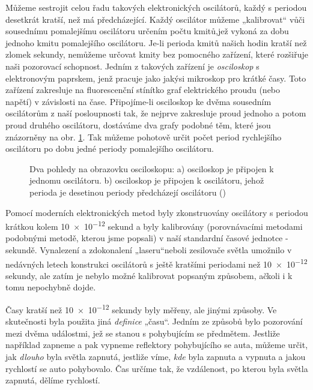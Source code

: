       Můžeme sestrojit celou řadu takových elektronických oscilátorů, každý s periodou desetkrát
      kratší, než má předcházející. Každý oscilátor můžeme „kalibrovat“ vůči sousednímu pomalejšímu
      oscilátoru určením počtu kmitů,jež vykoná za dobu jednoho kmitu pomalejšího oscilátoru. Je-li
      perioda kmitů našich hodin kratší než zlomek sekundy, nemůžeme určovat kmity bez pomocného
      zařízení, které rozšiřuje naši pozorovací schopnost. Jedním z takových zařízení je
      \emph{osciloskop} s elektronovým paprskem, jenž pracuje jako jakýsi mikroskop pro krátké časy.
      Toto zařízení zakresluje na fluorescenční stínítko graf elektrického proudu (nebo napětí) v
      závislosti na čase. Připojíme-li osciloskop ke dvěma sousedním oscilátorům z naší posloupnosti
      tak, že nejprve zakresluje proud jednoho a potom proud druhého oscilátoru, dostáváme dva grafy
      podobné těm, které jsou znázorněny na obr. \ref{fyz:fig0065}. Tak můžeme pohotově určit počet
      period rychlejšího oscilátoru po dobu jedné periody pomalejšího oscilátoru. 
      
      \begin{figure}[ht!]  %
        \centering
         \hspace{2em}
         \caption{Dva pohledy
        na obrazovku osciloskopu: a) osciloskop je připojen k jednomu oscilátoru. b) osciloskop je
        připojen k oscilátoru, jehož perioda je desetinou periody předcházejí oscilátoru
        (\cite[s.~66]{Feynman01})}
        \label{fyz:fig0065}
      \end{figure}
      
      Pomocí moderních elektronických metod byly zkonstruovány oscilátory s periodou krátkou kolem
      \num{10e-12} sekund a byly kalibrovány (porovnávacími metodami podobnými metodě, kterou jsme
      popsali) v naší standardní časové jednotce - sekundě. Vynalezení a zdokonalení „laseru“neboli
      zesilovače světla umožnilo v nedávných letech konstrukci oscilátorů s ještě kratšími periodami
      než \num{10e-12} sekundy, ale zatím je nebylo možné kalibrovat popsaným způsobem, ačkoli i k
      tomu nepochybně dojde.
      
      Časy kratší než \num{10e-12} sekundy byly měřeny, ale jinými způsoby. Ve skutečnosti byla
      použita jiná \emph{definice} „času“. Jedním ze způsobů bylo pozorování mezi dvěma událostmi,
      jež se stanou s pohybujícím se předmětem. Jestliže například zapneme a pak vypneme reflektory
      pohybujícího se auta, můžeme určit, jak \emph{dlouho} byla světla zapnutá, jestliže víme,
      \emph{kde} byla zapnuta a vypnuta a jakou rychlostí se auto pohybovalo. Čas určíme tak, že
      vzdálenost, po kterou byla světla zapnutá, dělíme rychlostí.
      
